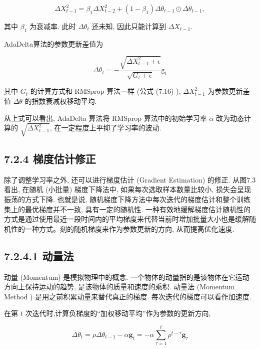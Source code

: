 \documentclass[10pt]{article}
\begin{document}
\begin{equation*}
\Delta X_{t-1}^{2}=\beta_{1} \Delta X_{t-2}^{2}+\left(1-\beta_{1}\right) \Delta \theta_{t-1} \odot \Delta \theta_{t-1}, \tag{7.19}
\end{equation*}


其中 $\beta_{1}$ 为衰减率. 此时 $\Delta \theta_{t}$ 还未知, 因此只能计算到 $\Delta X_{t-1}$.

AdaDelta算法的参数更新差值为


\begin{equation*}
\Delta \theta_{t}=-\frac{\sqrt{\Delta X_{t-1}^{2}+\epsilon}}{\sqrt{G_{t}+\epsilon}} \mathrm{g}_{t} \tag{7.20}
\end{equation*}


其中 $G_{t}$ 的计算方式和 RMSprop 算法一样 (公式 (7.16) ), $\Delta X_{t-1}^{2}$ 为参数更新差值 $\Delta \theta$ 的指数衰减权移动平均.

从上式可以看出, AdaDelta 算法将 RMSprop 算法中的初始学习率 $\alpha$ 改为动态计算的 $\sqrt{\Delta X_{t-1}^{2}}$, 在一定程度上平抑了学习率的波动.

\subsection*{7.2.4 梯度估计修正}
除了调整学习率之外, 还可以进行梯度估计 (Gradient Estimation) 的修正. 从图7.3看出, 在随机 (小批量) 梯度下降法中, 如果每次选取样本数量比较小, 损失会呈现振荡的方式下降. 也就是说, 随机梯度下降方法中每次迭代的梯度估计和整个训练集上的最优梯度并不一致, 具有一定的随机性. 一种有效地缓解梯度估计随机性的方式是通过使用最近一段时间内的平均梯度来代替当前时增加批量大小也是缓解随机性的一种方式。刻的随机梯度来作为参数更新的方向, 从而提高优化速度.

\subsection*{7.2.4.1 动量法}
动量 (Momentum) 是模拟物理中的概念. 一个物体的动量指的是该物体在它运动方向上保持运动的趋势, 是该物体的质量和速度的乘积. 动量法 (Momentum Method ) 是用之前积累动量来替代真正的梯度. 每次迭代的梯度可以看作加速度.

在第 $t$ 次迭代时,计算负梯度的“加权移动平均”作为参数的更新方向,


\begin{equation*}
\Delta \theta_{t}=\rho \Delta \theta_{t-1}-\alpha \boldsymbol{g}_{t}=-\alpha \sum_{\tau=1}^{t} \rho^{t-\tau} \boldsymbol{g}_{\tau} \tag{7.21}
\end{equation*}
\end{document}
